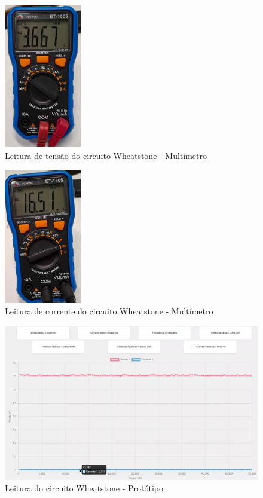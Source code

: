 \begin{figure}[htb!]
    \caption{Leitura de tensão do circuito Wheatstone - Multímetro}
    \label{fig:tensao-wheatstone-mult}
    \includegraphics[width=0.3\textwidth]{figuras/tensao-wheatstone-mult.png}
    \fonte{}
\end{figure}

\begin{figure}[htb!]
    \caption{Leitura de corrente do circuito Wheatstone - Multímetro}
    \label{fig:corrente-wheatstone-mult}
    \includegraphics[width=0.3\textwidth]{figuras/corrente-wheatstone-mult.png}
    \fonte{}
\end{figure}

\begin{figure}[htb!]
    \caption{Leitura do circuito Wheatstone - Protótipo}
    \label{fig:wheatstone-boy}
    \includegraphics[width=1\textwidth]{figuras/wheatstone-boy.png}
    \fonte{}
\end{figure}

